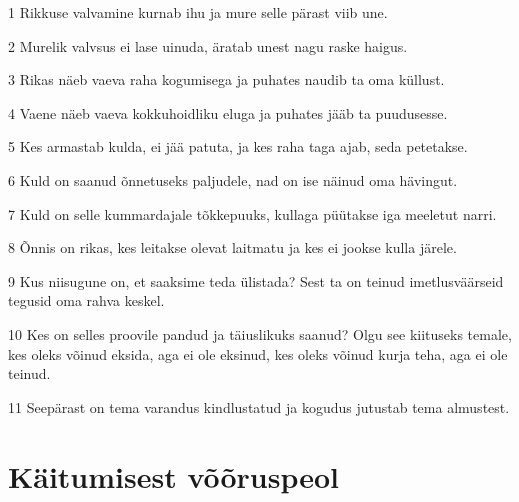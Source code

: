 \par 1 Rikkuse valvamine kurnab ihu ja mure selle pärast viib une.
\par 2 Murelik valvsus ei lase uinuda, äratab unest nagu raske haigus.
\par 3 Rikas näeb vaeva raha kogumisega ja puhates naudib ta oma küllust.
\par 4 Vaene näeb vaeva kokkuhoidliku eluga ja puhates jääb ta puudusesse.
\par 5 Kes armastab kulda, ei jää patuta, ja kes raha taga ajab, seda petetakse.
\par 6 Kuld on saanud õnnetuseks paljudele, nad on ise näinud oma hävingut.
\par 7 Kuld on selle kummardajale tõkkepuuks, kullaga püütakse iga meeletut narri.
\par 8 Õnnis on rikas, kes leitakse olevat laitmatu ja kes ei jookse kulla järele.
\par 9 Kus niisugune on, et saaksime teda ülistada? Sest ta on teinud imetlusväärseid tegusid oma rahva keskel.
\par 10 Kes on selles proovile pandud ja täiuslikuks saanud? Olgu see kiituseks temale, kes oleks võinud eksida, aga ei ole eksinud, kes oleks võinud kurja teha, aga ei ole teinud.
\par 11 Seepärast on tema varandus kindlustatud ja kogudus jutustab tema almustest.

\section*{Käitumisest võõruspeol}

